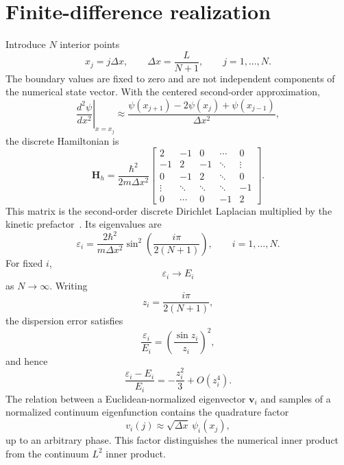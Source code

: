 \section*{Finite-difference realization}

Introduce $N$ interior points
\begin{equation}
    x_j=j\Delta x,
    \qquad
    \Delta x=\frac{L}{N+1},
    \qquad
    j=1,\ldots,N.
\end{equation}
The boundary values are fixed to zero and are not independent components of
the numerical state vector. With the centered second-order approximation,
\begin{equation}
    \left.
        \frac{d^2\psi}{dx^2}
    \right|_{x=x_j}
    \approx
    \frac{
        \psi(x_{j+1})-2\psi(x_j)+\psi(x_{j-1})
    }{\Delta x^2},
\end{equation}
the discrete Hamiltonian is
\begin{equation}
    \mathbf H_h
    =
    \frac{\hbar^2}{2m\Delta x^2}
    \begin{bmatrix}
        2 & -1 & 0 & \cdots & 0 \\
        -1 & 2 & -1 & \ddots & \vdots \\
        0 & -1 & 2 & \ddots & 0 \\
        \vdots & \ddots & \ddots & \ddots & -1 \\
        0 & \cdots & 0 & -1 & 2
    \end{bmatrix}.
\end{equation}
This matrix is the second-order discrete Dirichlet Laplacian multiplied by the
kinetic prefactor~\cite{strikwerda2004}. Its eigenvalues are
\begin{equation}
    \varepsilon_i
    =
    \frac{2\hbar^2}{m\Delta x^2}
    \sin^2\left(
        \frac{i\pi}{2(N+1)}
    \right),
    \qquad
    i=1,\ldots,N.
\end{equation}
For fixed $i$,
\begin{equation}
    \varepsilon_i\longrightarrow E_i
\end{equation}
as $N\rightarrow\infty$. Writing
\begin{equation}
    z_i=\frac{i\pi}{2(N+1)},
\end{equation}
the dispersion error satisfies
\begin{equation}
    \frac{\varepsilon_i}{E_i}
    =
    \left(\frac{\sin z_i}{z_i}\right)^2,
\end{equation}
and hence
\begin{equation}
    \frac{\varepsilon_i-E_i}{E_i}
    =
    -\frac{z_i^2}{3}+O(z_i^4).
\end{equation}
The relation between a Euclidean-normalized eigenvector $\mathbf v_i$ and
samples of a normalized continuum eigenfunction contains the quadrature factor
\begin{equation}
    v_i(j)
    \approx
    \sqrt{\Delta x}\,\psi_i(x_j),
\end{equation}
up to an arbitrary phase. This factor distinguishes the numerical inner
product from the continuum $L^2$ inner product.


